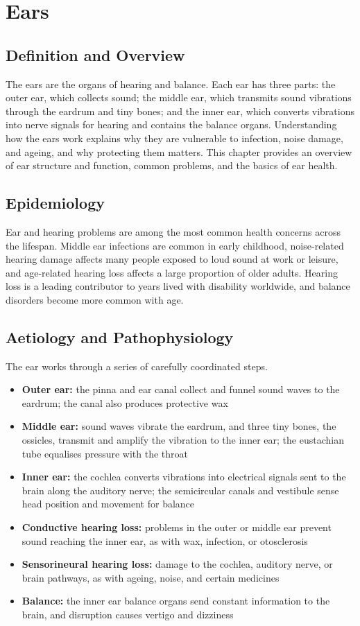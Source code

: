 \chapter{Ears}

\section*{Definition and Overview}
The ears are the organs of hearing and balance. Each ear has three parts: the outer ear, which collects sound; the middle ear, which transmits sound vibrations through the eardrum and tiny bones; and the inner ear, which converts vibrations into nerve signals for hearing and contains the balance organs. Understanding how the ears work explains why they are vulnerable to infection, noise damage, and ageing, and why protecting them matters. This chapter provides an overview of ear structure and function, common problems, and the basics of ear health.

\section*{Epidemiology}
Ear and hearing problems are among the most common health concerns across the lifespan. Middle ear infections are common in early childhood, noise-related hearing damage affects many people exposed to loud sound at work or leisure, and age-related hearing loss affects a large proportion of older adults. Hearing loss is a leading contributor to years lived with disability worldwide, and balance disorders become more common with age.

\section*{Aetiology and Pathophysiology}
The ear works through a series of carefully coordinated steps.
\begin{itemize}
    \item \textbf{Outer ear:} the pinna and ear canal collect and funnel sound waves to the eardrum; the canal also produces protective wax
    \item \textbf{Middle ear:} sound waves vibrate the eardrum, and three tiny bones, the ossicles, transmit and amplify the vibration to the inner ear; the eustachian tube equalises pressure with the throat
    \item \textbf{Inner ear:} the cochlea converts vibrations into electrical signals sent to the brain along the auditory nerve; the semicircular canals and vestibule sense head position and movement for balance
    \item \textbf{Conductive hearing loss:} problems in the outer or middle ear prevent sound reaching the inner ear, as with wax, infection, or otosclerosis
    \item \textbf{Sensorineural hearing loss:} damage to the cochlea, auditory nerve, or brain pathways, as with ageing, noise, and certain medicines
    \item \textbf{Balance:} the inner ear balance organs send constant information to the brain, and disruption causes vertigo and dizziness
\end{itemize}

